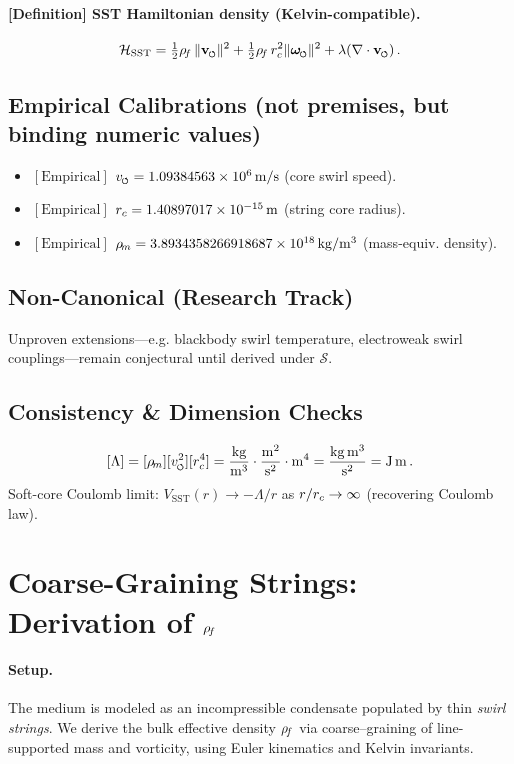 \documentclass[11pt]{article}
\begin{document}
\paragraph{[Definition] SST Hamiltonian density (Kelvin-compatible).}
    \[
        \mathcal{H}_{\text{SST}} = \tfrac{1}{2}\rhof\,\|\vswirl\|^2 + \tfrac{1}{2}\rhof\,\rc^2\|\omegas\|^2 + \lambda(\nabla\cdot\vswirl)\,.
    \]

\subsection*{Empirical Calibrations (not premises, but binding numeric values)}
\begin{itemize}
\item $[\text{Empirical}]$ $\vscore = 1.09384563\times 10^6\,\mathrm{m/s}$ (core swirl speed).
\item $[\text{Empirical}]$ $r_c = 1.40897017\times 10^{-15}\,\mathrm{m}$ (string core radius).
\item $[\text{Empirical}]$ $\rho_{\!m} = 3.8934358266918687\times 10^{18}\,\mathrm{kg/m^3}$ (mass-equiv. density).
\end{itemize}

\subsection*{Non-Canonical (Research Track)}
Unproven extensions—e.g. blackbody swirl temperature, electroweak swirl couplings—remain conjectural until derived under $\mathcal{S}$.

\subsection*{Consistency \& Dimension Checks}
\[
    [\Lambda] = [\rhom][\vscore^2][\rc^4]
    = \frac{\mathrm{kg}}{\mathrm{m^3}}\cdot\frac{\mathrm{m^2}}{\mathrm{s^2}}\cdot \mathrm{m^4}
    = \frac{\mathrm{kg\,m^3}}{\mathrm{s^2}}
    = \mathrm{J\,m}\,.
\]
Soft-core Coulomb limit: $V_{\text{SST}}(r)\to -\Lambda/r$ as $r/r_c\to\infty$ (recovering Coulomb law).

\section{Coarse-Graining Strings: Derivation of $\rho_{\!f}$}
\label{sec:canon_rhof_from_strings}
\paragraph{Setup.}
    The medium is modeled as an incompressible condensate populated by thin \emph{swirl strings}. We derive the bulk effective density $\rho_{\!f}$ via coarse–graining of line-supported mass and vorticity, using Euler kinematics and Kelvin invariants.
\end{document}
